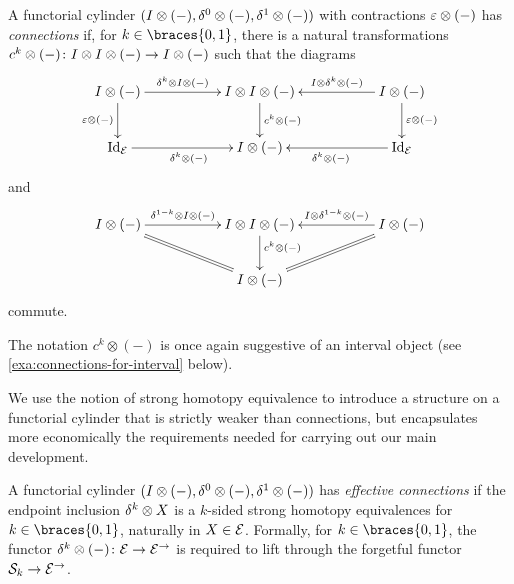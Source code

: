 \documentclass[reqno,10pt,a4paper,oneside,draft]{amsart}
\begin{document}
\begin{definition} \label{def:connections}
A functorial cylinder $(I \otimes (-), \delta^0 \otimes (-), \delta^1 \otimes (-))$ with contractions $\varepsilon \otimes (-)$ has \emph{connections} if, for $k \in \braces{0, 1}$, there is a natural transformations $c^k \otimes (-) \colon I \otimes I \otimes (-) \to I \otimes (-)$ such that the diagrams
\begin{equation} \label{connections:0}
\xymatrix@C+3em{
  \interval \otimes (-)
  \ar[r]^-{\kcyl \otimes \interval \otimes (-)}
  \ar[d]_{\ccyl \otimes (-)}
&
  \interval \otimes \interval \otimes (-)
  \ar[d]^{c^k \otimes (-)}
&
  \interval \otimes (-)
  \ar[l]_-{\interval \otimes \kcyl \otimes (-)}
  \ar[d]^{\ccyl \otimes (-)}
\\
  \Id_\catE
  \ar[r]_{\kcyl \otimes (-)}
&
  \interval \otimes (-)
&
  \Id_\catE
  \ar[l]^{\kcyl \otimes (-)}
}
\end{equation}
and
\begin{equation} \label{connections:1}
\xymatrix@C+3em{
  \interval \otimes (-)
  \ar[r]^-{\kcylinv \otimes \interval \otimes (-)}
  \ar@{=}[dr]
&
  \interval \otimes \interval \otimes (-)
  \ar[d]^(0.4){c^k \otimes (-)}
&
  \interval \otimes (-)
  \ar[l]_-{\interval \otimes \kcylinv \otimes (-)}
  \ar@{=}[dl]
\\&
  \interval \otimes (-)
}
\end{equation}
commute.
\end{definition}

The notation $c^k \otimes (-)$ is once again suggestive of an interval object (see \cref{exa:connections-for-interval} below).

We use the notion of strong homotopy equivalence to introduce a structure on a functorial cylinder that is strictly weaker than connections, but encapsulates more economically the requirements needed for carrying out our main development.

\begin{definition} \label{def:effective-connections}
A functorial cylinder $(I \otimes (-), \delta^0 \otimes (-), \delta^1 \otimes (-))$ has \emph{effective connections} if the endpoint inclusion $\delta^k \otimes X$ is a $k$-sided strong homotopy equivalences for $k \in \braces{0, 1}$, naturally in $X \in \mathcal{E}$.
Formally, for $k \in \braces{0, 1}$, the functor $\delta^k \otimes (-) \colon \mathcal{E} \to \mathcal{E}^\to$ is required to lift through the forgetful functor $\mathcal{S}_k \to \mathcal{E}^\to$.
\end{definition}
\end{document}
